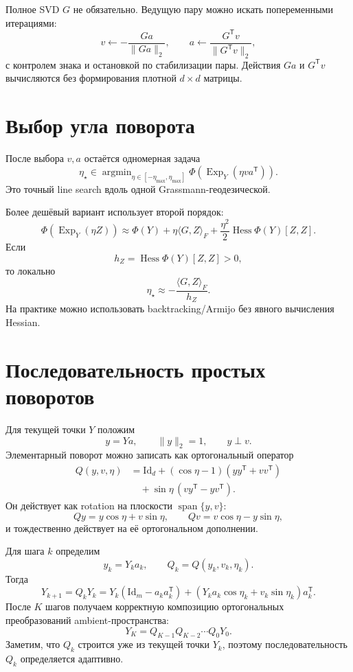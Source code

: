 \documentclass[11pt,a4paper]{article}
\newcommand{\T}{^{\mathsf T}}
\newcommand{\Id}{\mathrm{Id}}
\newcommand{\Exp}{\operatorname{Exp}}
\newcommand{\spanop}{\operatorname{span}}
\DeclareMathOperator{\argmin}{argmin}
\begin{document}
Полное SVD \(G\) не обязательно. Ведущую пару можно искать
попеременными итерациями:
\[
    v
    \leftarrow
    -\frac{Ga}{\|Ga\|_2},
    \qquad
    a
    \leftarrow
    \frac{G\T v}{\|G\T v\|_2},
\]
с контролем знака и остановкой по стабилизации пары. Действия
\(Ga\) и \(G\T v\) вычисляются без формирования плотной
\(d\times d\) матрицы.

\section{Выбор угла поворота}

После выбора \(v,a\) остаётся одномерная задача
\[
    \eta_\star
    \in
    \argmin_{\eta\in[-\eta_{\max},\eta_{\max}]}
    \Phi\left(
        \Exp_Y(\eta va\T)
    \right).
\]
Это точный line search вдоль одной Grassmann-геодезической.

Более дешёвый вариант использует второй порядок:
\[
    \Phi(\Exp_Y(\eta Z))
    \approx
    \Phi(Y)
    +
    \eta\langle G,Z\rangle_F
    +
    \frac{\eta^2}{2}
    \operatorname{Hess}\Phi(Y)[Z,Z].
\]
Если
\[
    h_Z
    =
    \operatorname{Hess}\Phi(Y)[Z,Z]>0,
\]
то локально
\[
    \eta_\star
    \approx
    -\frac{\langle G,Z\rangle_F}{h_Z}.
\]
На практике можно использовать backtracking/Armijo без явного
вычисления Hessian.

\section{Последовательность простых поворотов}

Для текущей точки \(Y\) положим
\[
    y=Ya,
    \qquad
    \|y\|_2=1,
    \qquad
    y\perp v.
\]
Элементарный поворот можно записать как ортогональный оператор
\[
\begin{aligned}
    Q(y,v,\eta)
    &={}
    \Id_d
    +(\cos\eta-1)(yy\T+vv\T)\\
    &\quad
    +\sin\eta\,(vy\T-yv\T).
\end{aligned}
\]
Он действует как rotation на плоскости \(\spanop\{y,v\}\):
\[
    Qy=y\cos\eta+v\sin\eta,
    \qquad
    Qv=v\cos\eta-y\sin\eta,
\]
и тождественно действует на её ортогональном дополнении.

Для шага \(k\) определим
\[
    y_k=Y_ka_k,
    \qquad
    Q_k=Q(y_k,v_k,\eta_k).
\]
Тогда
\[
    \boxed{
    Y_{k+1}=Q_kY_k
    =
    Y_k(\Id_m-a_ka_k\T)
    +
    (Y_ka_k\cos\eta_k+v_k\sin\eta_k)a_k\T.
    }
\]
После \(K\) шагов получаем корректную композицию ортогональных
преобразований ambient-пространства:
\[
    \boxed{
    Y_K
    =
    Q_{K-1}Q_{K-2}\cdots Q_0Y_0.
    }
\]
Заметим, что \(Q_k\) строится уже из текущей точки \(Y_k\), поэтому
последовательность \(Q_k\) определяется адаптивно.
\end{document}

